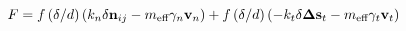 \documentclass[12pt]{article}
\begin{document}
$$
   F = f\left(\delta/d\right)\left(k_n \delta \mathbf{n}_{ij} -  
   m_{\mbox{\scriptsize{eff}}} \gamma_n\mathbf{ v}_n\right) + 
   f\left(\delta/d\right)\left(-k_t \delta\mathbf{ \Delta s}_t - 
   m_{\mbox{\scriptsize{eff}}} \gamma_t \mathbf{v}_t\right)
$$
\end{document}
